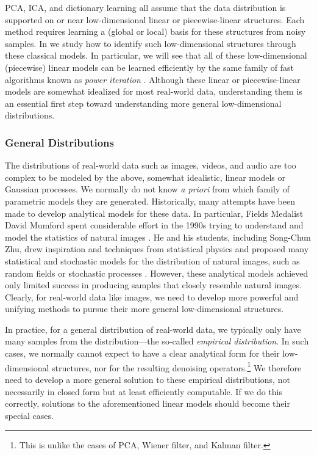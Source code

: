 \documentclass[../../book-main.tex]{subfiles}
\begin{document}
PCA, ICA, and dictionary learning all assume that the data
distribution is supported on or near low-dimensional linear or
piecewise-linear structures. Each method requires learning a (global
or local) basis for these structures from noisy samples. In
 we study how to identify such low-dimensional
structures through these classical models. In particular, we will see
that all of these low-dimensional (piecewise) linear models can be
learned efficiently by the same family of fast algorithms known as
\textit{power iteration} \cite{Zhai-2020}. Although these linear or
piecewise-linear models are somewhat idealized for most real-world
data, understanding them is an essential first step toward
understanding more general low-dimensional distributions.

\subsubsection{General Distributions}\label{sec:denoising-intro}

The distributions of real-world data such as images, videos, and
audio are too complex to be modeled by the above, somewhat
idealistic, linear models or Gaussian processes. We normally do not
know \textit{a priori} from which family of parametric models they
are generated. Historically, many attempts have been made to develop
analytical models for these data. In particular, Fields Medalist
David Mumford spent considerable effort in the 1990s trying to
understand and model the statistics of natural images
\cite{Mumford1996TheSD}. He and his students, including Song-Chun
Zhu, drew inspiration and techniques from statistical physics and
proposed many statistical and stochastic models for the distribution
of natural images, such as random fields or stochastic processes
\cite{Zhu-Entropy-1997,Zhu1997LearningGP,Zhu1997Prior,Huang-Mumford,Mumford-1999,Lee-Mumford}.
However, these analytical models achieved only limited success in
producing samples that closely resemble natural images. Clearly, for
real-world data like images, we need to develop more powerful and
unifying methods to pursue their more general low-dimensional structures.

In practice, for a general distribution of real-world data, we
typically only have many samples from the distribution---the
so-called \textit{empirical distribution}. In such cases, we normally
cannot expect to have a clear analytical form for their
low-dimensional structures, nor for the resulting denoising
operators.\footnote{This is unlike the cases of PCA, Wiener filter,
and Kalman filter.} We therefore need to develop a more general
solution to these empirical distributions, not necessarily in closed
form but at least efficiently computable. If we do this correctly,
solutions to the aforementioned linear models should become their special cases.
\end{document}

